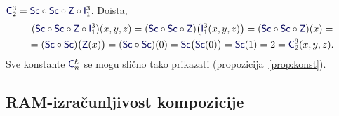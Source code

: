 \begin{primjer}\label{pr:C23}
$\f C_2^3=\f{Sc}\circ\f{Sc}\circ\f Z\circ\f I_1^3$. Doista,
\begin{multline}
(\f{Sc}\circ\f{Sc}\circ\f Z\circ\f I_1^3)(x,y,z)=(\f{Sc}\circ\f{Sc}\circ\f Z)\bigl(\f I_1^3(x,y,z)\bigr)=(\f{Sc}\circ\f{Sc}\circ\f Z)(x)=\\
=(\f{Sc}\circ\f{Sc})\bigl(\f Z(x)\bigr)=(\f{Sc}\circ\f{Sc})(0)=\f{Sc}\bigl(\f{Sc}(0)\bigr)=\f{Sc}(1)=2=\f C_2^3(x,y,z).
\end{multline}
    Sve konstante $\f C_n^k$ se mogu slično tako prikazati (propozicija~\ref{prop:konst}).
\end{primjer}

\subsection{RAM-izračunljivost kompozicije}


